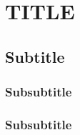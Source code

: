 \documentclass[10pt, a4paper]{article}
\begin{document}
%
%
\section{TITLE}
\lipsum[1]
\subsection{Subtitle}
\subsubsection{Subsubtitle}
\lipsum[2]
\subsubsection{Subsubtitle}
\lipsum[3]
\end{document}
